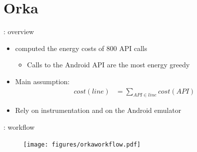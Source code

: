 \section{Orka}
\begin{frame}{\orka{}: overview}
\begin{itemize}
\item \lv{} \cite{linares2014mining} computed the energy costs of 800 API calls
\begin{itemize}
\item Calls to the Android API are the most energy greedy
\end{itemize}
\item Main assumption:
\begin{align*}
cost(line) &=  \sum_{API \in line} cost(API) 
\end{align*}
\item Rely on \alert{instrumentation} and on the Android \alert{emulator}
\end{itemize}
\end{frame}
%
%
\begin{frame}{\orka{}: workflow}
\begin{figure}
        \texttt{[image: figures/orkaworkflow.pdf]}
\end{figure}
\end{frame}
%
%
